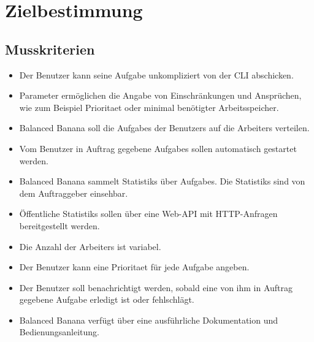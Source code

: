\documentclass[a4paper,12pt]{article}
\begin{document}
\clearpage
\section{Zielbestimmung}
\subsection{Musskriterien}
\begin{itemize}[nosep]
	
	\item Der \gls{Benutzer} kann seine \gls{Aufgabe} unkompliziert von der \gls{CLI} abschicken.
	
	\item \gls{Parameter} ermöglichen die Angabe von Einschränkungen und Ansprüchen, wie zum Beispiel \gls{Prioritaet} oder minimal benötigter Arbeitsspeicher.
		
	\item Balanced Banana soll die \glspl{Aufgabe} der \glspl{Benutzer} auf die \glspl{Arbeiter} verteilen.
	
	\item Vom \gls{Benutzer} in Auftrag gegebene \glspl{Aufgabe} sollen automatisch gestartet werden.
	
	\item Balanced Banana sammelt \glspl{Statistik} über \glspl{Aufgabe}. Die \glspl{Statistik} sind von dem \gls{Auftraggeber} einsehbar.
	
	\item Öffentliche \glspl{Statistik} sollen über eine \gls{Web-API} mit \gls{HTTP-Anfragen} bereitgestellt werden.
	
	\item Die Anzahl der \glspl{Arbeiter} ist variabel.
	
	\item Der \gls{Benutzer} kann eine \gls{Prioritaet} für jede \gls{Aufgabe} angeben.
	
	\item Der \gls{Benutzer} soll benachrichtigt werden, sobald eine von ihm in Auftrag gegebene \gls{Aufgabe} erledigt ist oder fehlschlägt.
	
	
	\item Balanced Banana verfügt über eine ausführliche Dokumentation und Bedienungsanleitung.

\end{itemize}
\end{document}
